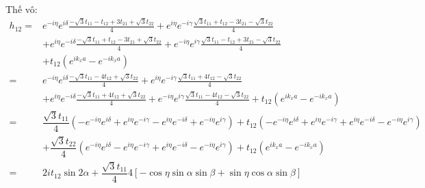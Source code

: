 \documentclass{report}
\begin{document}
\noindent Thế vô:
\begin{align*}
	h_{12} =             & e^{-i\eta} e^{i\delta} \frac{-\sqrt{3}t_{11} - t_{12} + 3t_{21} + \sqrt{3}t_{22}}{4} + e^{i\eta} e^{-i\gamma} \frac{\sqrt{3}t_{11} + t_{12} - 3 t_{21} -\sqrt{3}t_{22}}{4}                                                                                              \\
	                     & + e^{i\eta} e^{-i\delta}  \frac{-\sqrt{3}t_{11} + t_{12} - 3 t_{21} + \sqrt{3}t_{22}}{4} + e^{-i\eta} e^{i\gamma} \frac{\sqrt{3}t_{11} - t_{12} + 3 t_{21} - \sqrt{3}t_{22}}{4}                                                                                         \\
	                     & + t_{12}\left( e^{ik_x a} - e^{-ik_x a} \right)                                                                                                                                                                                                                         \\
	=                    & e^{-i\eta} e^{i\delta} \frac{-\sqrt{3}t_{11} - 4t_{12} + \sqrt{3}t_{22}}{4} + e^{i\eta} e^{-i\gamma} \frac{\sqrt{3}t_{11} + 4t_{12} -\sqrt{3}t_{22}}{4}                                                                                                                 \\
	                     & + e^{i\eta} e^{-i\delta}  \frac{-\sqrt{3}t_{11} + 4t_{12} + \sqrt{3}t_{22}}{4} + e^{-i\eta} e^{i\gamma} \frac{\sqrt{3}t_{11} - 4t_{12} - \sqrt{3}t_{22}}{4} + t_{12}\left( e^{ik_x a} - e^{-ik_x a} \right)                                                             \\
	=                    & \dfrac{\sqrt{3} t_{11}}{4}\left( - e^{-i\eta} e^{i\delta} + e^{i\eta} e^{-i\gamma} - e^{i\eta} e^{-i\delta} + e^{-i\eta} e^{i\gamma} \right) + t_{12}\left( - e^{-i\eta} e^{i\delta} + e^{i\eta} e^{-i\gamma} + e^{i\eta} e^{-i\delta} - e^{-i\eta} e^{i\gamma} \right) \\
	                     & + \dfrac{\sqrt{3} t_{22}}{4}\left( e^{-i\eta} e^{i\delta} - e^{i\eta} e^{-i\gamma} + e^{i\eta} e^{-i\delta} - e^{-i\eta} e^{i\gamma} \right) + t_{12}\left( e^{ik_x a} - e^{-ik_x a} \right)                                                                            \\
	=                    & 2it_{12}\sin2\alpha + \dfrac{\sqrt{3} t_{11} }{4}4\left[ -\cos\eta\sin\alpha\sin\beta + \sin\eta\cos\alpha\sin\beta \right]                                                                                                                                             \\

\end{align*}
\end{document}

